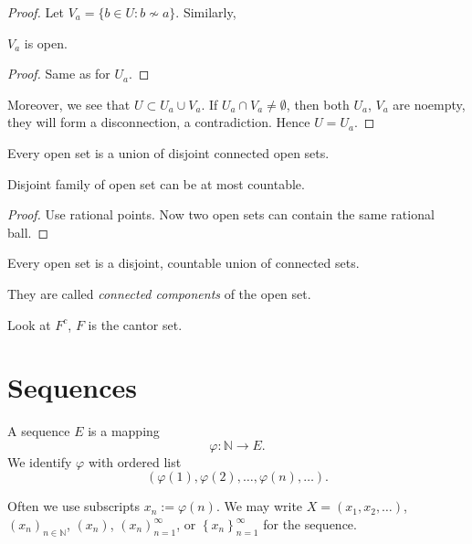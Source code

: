 \begin{proof}
	Let $V_a = \{b \in U: b \not\sim a\} $. Similarly,
	\begin{claim}
		$V_a$ is open.
	\end{claim}
	\begin{proof}
		Same as for $U_a$.
	\end{proof}

	Moreover, we see that $U \subset U_a \cup V_a$.
	If $U_a \cap V_a \neq \emptyset $, then both $U_a$, $V_a$ are noempty, they will form a disconnection, a contradiction. Hence $U = U_a$.
\end{proof}

\begin{corollary}
	Every open set is a union of disjoint connected open sets.
\end{corollary}

\begin{lemma}
	Disjoint family of open set can be at most countable.
\end{lemma}
\begin{proof}
	Use rational points. Now two open sets can contain the same rational ball.
\end{proof}


\begin{theorem}
	Every open set is a disjoint, countable union of connected sets.

	They are called \textit{connected components} of the open set.
\end{theorem}
\begin{example}
	Look at $F^c$, $F$ is the cantor set.
\end{example}

\section{Sequences}

\begin{definition}[Sequence]
	A sequence $E$ is a mapping \[
		\varphi: \mathbb{N} \to  E
	.\] 
	We identify $\varphi$ with ordered list \[
		(\varphi(1), \varphi(2), \ldots, \varphi(n), \ldots)
	.\] 
\end{definition}
\begin{notation}
	Often we use subscripts $x_n := \varphi(n)$.
	We may write $X = (x_1, x_2, \ldots)$, $(x_n)_{n\in \mathbb{N}}$, $(x_n)$, $(x_n)_{n = 1}^\infty $, or $\left\{ x_n \right\}_{n=1}^\infty  $ for the sequence. 
\end{notation}
